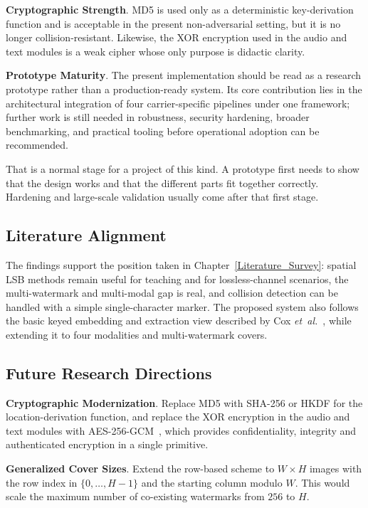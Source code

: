 \textbf{Cryptographic Strength}. MD5 is used only as a deterministic key-derivation function and is acceptable in the present non-adversarial setting, but it is no longer collision-resistant. Likewise, the XOR encryption used in the audio and text modules is a weak cipher whose only purpose is didactic clarity.

\textbf{Prototype Maturity}. The present implementation should be read as a research prototype rather than a production-ready system. Its core contribution lies in the architectural integration of four carrier-specific pipelines under one framework; further work is still needed in robustness, security hardening, broader benchmarking, and practical tooling before operational adoption can be recommended.

That is a normal stage for a project of this kind. A prototype first needs to show that the design works and that the different parts fit together correctly. Hardening and large-scale validation usually come after that first stage.

\subsection{Literature Alignment}

The findings support the position taken in Chapter~\ref{Literature_Survey}: spatial LSB methods remain useful for teaching and for lossless-channel scenarios, the multi-watermark and multi-modal gap is real, and collision detection can be handled with a simple single-character marker. The proposed system also follows the basic keyed embedding and extraction view described by Cox \emph{et~al.}~\cite{cox2007digital}, while extending it to four modalities and multi-watermark covers.

\subsection{Future Research Directions}

\textbf{Cryptographic Modernization}. Replace MD5 with SHA-256 or HKDF for the location-derivation function, and replace the XOR encryption in the audio and text modules with AES-256-GCM~\cite{daemen2002design}, which provides confidentiality, integrity and authenticated encryption in a single primitive.

\textbf{Generalized Cover Sizes}. Extend the row-based scheme to $W \times H$ images with the row index in $\{0, \ldots, H-1\}$ and the starting column modulo $W$. This would scale the maximum number of co-existing watermarks from $256$ to $H$.

